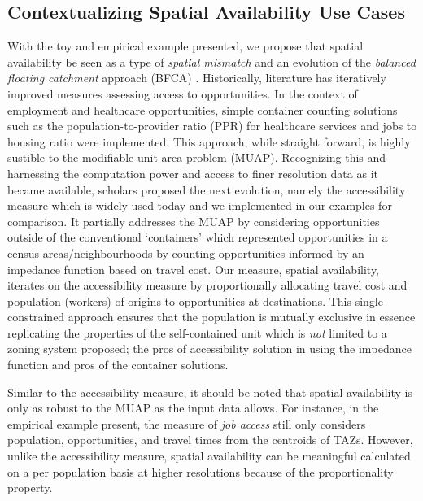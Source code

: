 \documentclass[]{elsarticle} %
\begin{document}
\hypertarget{contextualizing-spatial-availability-use-cases}{%
\subsection{Contextualizing Spatial Availability Use
Cases}\label{contextualizing-spatial-availability-use-cases}}

With the toy and empirical example presented, we propose that spatial
availability be seen as a type of \emph{spatial mismatch} and an
evolution of the \emph{balanced floating catchment} approach (BFCA) .
Historically, literature has iteratively improved measures assessing
access to opportunities. In the context of employment and healthcare
opportunities, simple container counting solutions such as the
population-to-provider ratio (PPR) for healthcare services and jobs to
housing ratio were implemented. This approach, while straight forward,
is highly sustible to the modifiable unit area problem (MUAP).
Recognizing this and harnessing the computation power and access to
finer resolution data as it became available, scholars proposed the next
evolution, namely the accessibility measure which is widely used today
and we implemented in our examples for comparison. It partially
addresses the MUAP by considering opportunities outside of the
conventional `containers' which represented opportunities in a census
areas/neighbourhoods by counting opportunities informed by an impedance
function based on travel cost. Our measure, spatial availability,
iterates on the accessibility measure by proportionally allocating
travel cost and population (workers) of origins to opportunities at
destinations. This single-constrained approach ensures that the
population is mutually exclusive in essence replicating the properties
of the self-contained unit which is \emph{not} limited to a zoning
system proposed; the pros of accessibility solution in using the
impedance function and pros of the container solutions.

Similar to the accessibility measure, it should be noted that spatial
availability is only as robust to the MUAP as the input data allows. For
instance, in the empirical example present, the measure of \emph{job
access} still only considers population, opportunities, and travel times
from the centroids of TAZs. However, unlike the accessibility measure,
spatial availability can be meaningful calculated on a per population
basis at higher resolutions because of the proportionality property.
\end{document}
